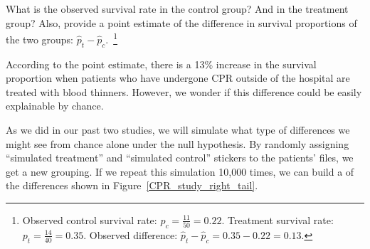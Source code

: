 \begin{exercise}
What is the observed survival rate in the control group? And in the treatment group? Also, provide a point estimate of the difference in survival proportions of the two groups: $\hat{p}_t - \hat{p}_c$.~\footnote{Observed control survival rate: $p_c = \frac{11}{50} = 0.22$. Treatment survival rate: $p_t = \frac{14}{40} = 0.35$. Observed difference: $\hat{p}_t - \hat{p}_c = 0.35 - 0.22 = 0.13$.}
\end{exercise}

According to the point estimate, there is a 13\% increase in the survival proportion when patients who have undergone CPR outside of the hospital are treated with blood thinners. However, we wonder if this difference could be easily explainable by chance.

As we did in our past two studies, we will simulate what type of differences we might see from chance alone under the null hypothesis. By randomly assigning ``simulated treatment'' and ``simulated control'' stickers to the patients' files, we get a new grouping. If we repeat this simulation 10,000 times, we can build a  of the differences shown in Figure~\ref{CPR_study_right_tail}.



